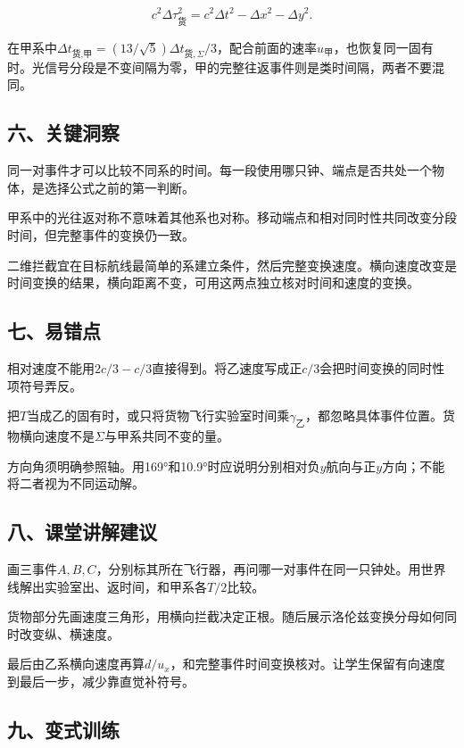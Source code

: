 \documentclass[12pt,a4paper,fontset=fandol]{ctexart}
\begin{document}
\[
c^2\Delta\tau_{\text{货}}^2
=c^2\Delta t^2-\Delta x^2-\Delta y^2.
\]

在甲系中\(\Delta t_{\text{货},\text{甲}}=(13/\sqrt5)\Delta t_{\text{货},\Sigma}/3\)，配合前面的速率\(u_\text{甲}\)，也恢复同一固有时。光信号分段是不变间隔为零，甲的完整往返事件则是类时间隔，两者不要混同。

\subsection{六、关键洞察}\label{ux516dux5173ux952eux6d1eux5bdf-4}

同一对事件才可以比较不同系的时间。每一段使用哪只钟、端点是否共处一个物体，是选择公式之前的第一判断。

甲系中的光往返对称不意味着其他系也对称。移动端点和相对同时性共同改变分段时间，但完整事件的变换仍一致。

二维拦截宜在目标航线最简单的系建立条件，然后完整变换速度。横向速度改变是时间变换的结果，横向距离不变，可用这两点独立核对时间和速度的变换。

\subsection{七、易错点}\label{ux4e03ux6613ux9519ux70b9-4}

相对速度不能用\(2c/3-c/3\)直接得到。将乙速度写成正\(c/3\)会把时间变换的同时性项符号弄反。

把\(T\)当成乙的固有时，或只将货物飞行实验室时间乘\(\gamma_\text{乙}\)，都忽略具体事件位置。货物横向速度不是\(\Sigma\)与甲系共同不变的量。

方向角须明确参照轴。用169°和10.9°时应说明分别相对负\(y\)航向与正\(y\)方向；不能将二者视为不同运动解。

\subsection{八、课堂讲解建议}\label{ux516bux8bfeux5802ux8bb2ux89e3ux5efaux8bae-4}

画三事件\(A,B,C\)，分别标其所在飞行器，再问哪一对事件在同一只钟处。用世界线解出实验室出、返时间，和甲系各\(T/2\)比较。

货物部分先画速度三角形，用横向拦截决定正根。随后展示洛伦兹变换分母如何同时改变纵、横速度。

最后由乙系横向速度再算\(d/u_x\)，和完整事件时间变换核对。让学生保留有向速度到最后一步，减少靠直觉补符号。

\subsection{九、变式训练}\label{ux4e5dux53d8ux5f0fux8badux7ec3-4}
\end{document}
